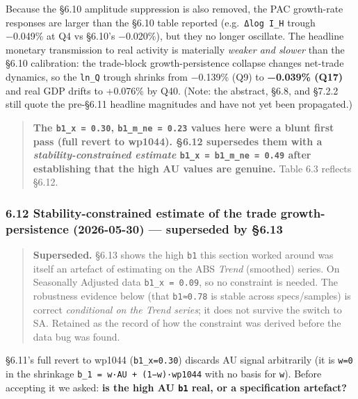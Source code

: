 \documentclass[
]{article}
\begin{document}
Because the §6.10 amplitude suppression is also removed, the PAC
growth-rate responses are larger than the §6.10 table reported
(e.g.~\texttt{Δlog\ I\_H} trough −0.049\% at Q4 vs §6.10's −0.020\%),
but they no longer oscillate. The headline monetary transmission to real
activity is materially \emph{weaker and slower} than the §6.10
calibration: the trade-block growth-persistence collapse changes
net-trade dynamics, so the \texttt{ln\_Q} trough shrinks from −0.139\%
(Q9) to \textbf{−0.039\% (Q17)} and real GDP drifts to +0.076\% by Q40.
(Note: the abstract, §6.8, and §7.2.2 still quote the pre-§6.11 headline
magnitudes and have not yet been propagated.)

\begin{quote}
\textbf{The \texttt{b1\_x\ =\ 0.30}, \texttt{b1\_m\_ne\ =\ 0.23} values
here were a blunt first pass (full revert to wp1044). §6.12 supersedes
them with a \emph{stability-constrained estimate}
\texttt{b1\_x\ =\ b1\_m\_ne\ =\ 0.49} after establishing that the high
AU values are genuine.} Table 6.3 reflects §6.12.
\end{quote}

\subsubsection{\texorpdfstring{6.12 Stability-constrained estimate of
the trade growth-persistence (2026-05-30) --- \textbf{superseded by
§6.13}}{6.12 Stability-constrained estimate of the trade growth-persistence (2026-05-30) --- superseded by §6.13}}\label{stability-constrained-estimate-of-the-trade-growth-persistence-2026-05-30-superseded-by-6.13}

\begin{quote}
\textbf{Superseded.} §6.13 shows the high \texttt{b1} this section
worked around was itself an artefact of estimating on the ABS
\emph{Trend} (smoothed) series. On Seasonally Adjusted data
\texttt{b1\_x\ =\ 0.09}, so no constraint is needed. The robustness
evidence below (that \texttt{b1≈0.78} is stable across specs/samples) is
correct \emph{conditional on the Trend series}; it does not survive the
switch to SA. Retained as the record of how the constraint was derived
before the data bug was found.
\end{quote}

§6.11's full revert to wp1044 (\texttt{b1\_x=0.30}) discards AU signal
arbitrarily (it is \texttt{w=0} in the shrinkage
\texttt{b\_1\ =\ w·AU\ +\ (1−w)·wp1044} with no basis for \texttt{w}).
Before accepting it we asked: \textbf{is the high AU \texttt{b1} real,
or a specification artefact?}
\end{document}
